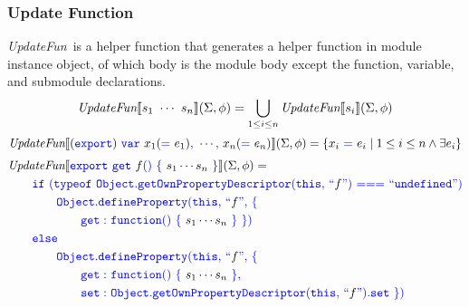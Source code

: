 \documentclass[a4paper]{article}
\newcommand{\code}[1]{\textcolor{blue}{\tt #1}}
\newcommand{\UpdateFun}{\emph{UpdateFun}}
\begin{document}
\subsubsection{Update Function}
\UpdateFun\ is a helper function that generates a helper function in module instance object, of which body is the module body except the function, variable, and submodule declarations.
\begin{equation*}
\UpdateFun \llbracket s_1\ \cdots\ s_n \rrbracket (\Sigma, \phi) = \bigcup_{1 \le i \le n} \UpdateFun \llbracket s_i \rrbracket (\Sigma, \phi)
\end{equation*}
\begin{equation*}
\UpdateFun \llbracket (\code{export})\ \code{var}\ x_1(\code{=}\ e_1)\code{,}\ \cdots\code{,}\ x_n(\code{=}\ e_n) \rrbracket (\Sigma, \phi) = \{ x_i\ \code{=}\ e_i \mid 1 \le i \le n \wedge \exists e_i \}
\end{equation*}
\begin{equation*}
\begin{split}
&\UpdateFun \llbracket \code{export}\ \code{get}\ f\code{()}\ \code{\{}\ s_1 \cdots s_n\ \code{\}} \rrbracket (\Sigma, \phi) = \\
&\qquad \code{if}\ \code{(typeof}\ \code{Object.getOwnPropertyDescriptor(this,}\ \code{``}f\code{")}\ \code{===}\ \code{``undefined")} \\
&\qquad\qquad \code{Object.defineProperty(this,}\ \code{``}f\code{",}\ \code{\{} \\
&\qquad\qquad\qquad \code{get:}\ \code{function()}\ \code{\{}\ s_1 \cdots s_n\ \code{\}\ \})} \\
&\qquad \code{else} \\
&\qquad\qquad \code{Object.defineProperty(this,}\ \code{``}f\code{",}\ \code{\{} \\
&\qquad\qquad\qquad \code{get:}\ \code{function()}\ \code{\{}\ s_1 \cdots s_n\ \code{\},} \\
&\qquad\qquad\qquad \code{set:}\ \code{Object.getOwnPropertyDescriptor(this,}\ \code{``}f\code{").set\ \})}
\end{split}
\end{equation*}
\end{document}
